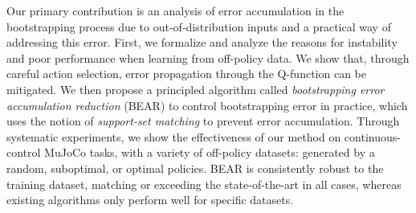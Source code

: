 Our primary contribution is an analysis of error accumulation in the bootstrapping process due to out-of-distribution inputs and a practical way of addressing this error. 
First, we formalize and analyze the reasons for instability and poor performance when learning from off-policy data. We show that, through careful action selection, error propagation through the Q-function can be mitigated. We then propose a principled algorithm called \emph{bootstrapping error accumulation reduction} (BEAR) to control bootstrapping error in practice, which uses the notion of \emph{support-set matching} to prevent error accumulation. Through systematic experiments, we show the effectiveness of our method on continuous-control MuJoCo tasks, with a variety of off-policy datasets: generated by a random, suboptimal, or optimal policies. BEAR is consistently robust to the training dataset, matching or exceeding the state-of-the-art in all cases, whereas existing algorithms only perform well for specific datasets.

